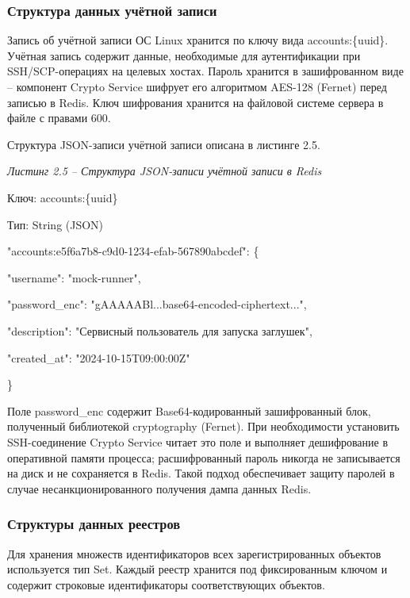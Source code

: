 \documentclass[
]{article}
\begin{document}
\subsubsection{Структура данных учётной
записи}\label{ux441ux442ux440ux443ux43aux442ux443ux440ux430-ux434ux430ux43dux43dux44bux445-ux443ux447ux451ux442ux43dux43eux439-ux437ux430ux43fux438ux441ux438}

Запись об учётной записи ОС Linux хранится по ключу вида
accounts:\{uuid\}. Учётная запись содержит данные, необходимые для
аутентификации при SSH/SCP-операциях на целевых хостах. Пароль хранится
в зашифрованном виде -- компонент Crypto Service шифрует его алгоритмом
AES-128 (Fernet) перед записью в Redis. Ключ шифрования хранится на
файловой системе сервера в файле с правами 600.

Структура JSON-записи учётной записи описана в листинге 2.5.

\emph{Листинг 2.5 -- Структура JSON-записи учётной записи в Redis}

Ключ: accounts:\{uuid\}

Тип: String (JSON)

"accounts:e5f6a7b8-c9d0-1234-efab-567890abcdef": \{

"username": "mock-runner",

"password\_enc": "gAAAAABl...base64-encoded-ciphertext...",

"description": "Сервисный пользователь для запуска заглушек",

"created\_at": "2024-10-15T09:00:00Z"

\}

Поле password\_enc содержит Base64-кодированный зашифрованный блок,
полученный библиотекой cryptography (Fernet). При необходимости
установить SSH-соединение Crypto Service читает это поле и выполняет
дешифрование в оперативной памяти процесса; расшифрованный пароль
никогда не записывается на диск и не сохраняется в Redis. Такой подход
обеспечивает защиту паролей в случае несанкционированного получения
дампа данных Redis.

\subsubsection{Структуры данных
реестров}\label{ux441ux442ux440ux443ux43aux442ux443ux440ux44b-ux434ux430ux43dux43dux44bux445-ux440ux435ux435ux441ux442ux440ux43eux432}

Для хранения множеств идентификаторов всех зарегистрированных объектов
используется тип Set. Каждый реестр хранится под фиксированным ключом и
содержит строковые идентификаторы соответствующих объектов.
\end{document}
